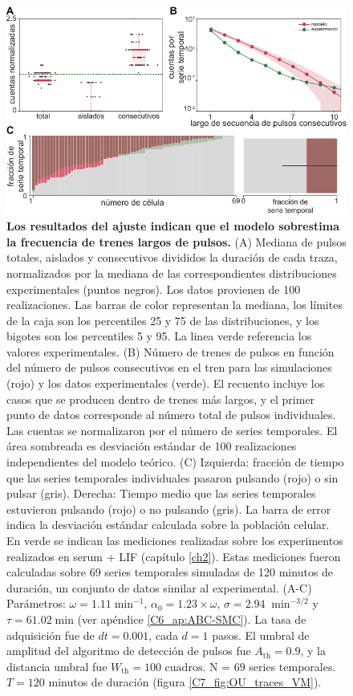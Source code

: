 \documentclass[./main.tex]{subfiles}
\begin{document}
\begin{figure}
    \centering
    \includegraphics[width=1\columnwidth]{figures/chapter7/C7_OU_validation.pdf} 
    \caption{\textbf{Los resultados del ajuste indican que el modelo sobrestima la frecuencia de trenes largos de pulsos.} (A) Mediana de pulsos totales, aislados y consecutivos divididos la duración de cada traza, normalizados por la mediana de las correspondientes distribuciones experimentales (puntos negros). Los datos provienen de 100 realizaciones. Las barras de color representan la mediana, los límites de la caja son los percentiles 25 y 75 de las distribuciones, y los bigotes son los percentiles 5 y 95. La linea verde referencia los valores experimentales. (B) Número de trenes de pulsos en función del número de pulsos consecutivos en el tren para las simulaciones (rojo) y los datos experimentales (verde). El recuento incluye los casos que se producen dentro de trenes más largos, y el primer punto de datos corresponde al número total de pulsos individuales. Las cuentas se normalizaron por el número de series temporales. El área sombreada es desviación estándar de 100 realizaciones independientes del modelo teórico. (C) Izquierda: fracción de tiempo que las series temporales individuales pasaron pulsando (rojo) o sin pulsar (gris). Derecha: Tiempo medio que las series temporales estuvieron pulsando (rojo) o no pulsando (gris). La barra de error indica la desviación estándar calculada sobre la población celular. En verde se indican las mediciones realizadas sobre los experimentos realizados en serum + LIF (capítulo \ref{ch2}). Estas mediciones fueron calculadas sobre 69 series temporales simuladas de 120 minutos de duración, un conjunto de datos similar al experimental. (A-C) Parámetros: $\omega = 1.11 \; \text{min}^{-1}$, $\alpha_0 = 1.23 \times \omega$, $ \sigma = 2.94 \; \; \text{min}^{-3/2}$ y $\tau = 61.02 \; \text{min} $ (ver apéndice \ref{C6_ap:ABC-SMC}). La tasa de adquisición fue de $dt = 0.001$, cada $d = 1$ pasos. El umbral de amplitud del algoritmo de detección de pulsos fue $A_{\text{th}} = 0.9$, y la distancia umbral fue $W_{\text{th}} = 100\text{ cuadros}$. N = $69$ series temporales. $T = 120$ minutos de duración (figura \ref{C7_fig:OU_traces_VM}).}
    \label{C7_fig:OU_param_evaluation}
\end{figure} 
\end{document}

